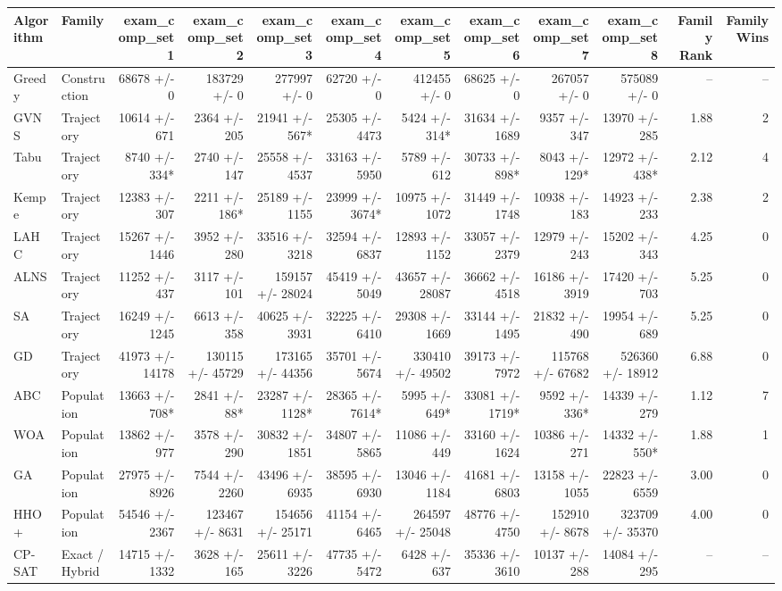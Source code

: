 \begin{tabular}{llrrrrrrrrrr}
\toprule
Algorithm & Family & exam\_comp\_set1 & exam\_comp\_set2 & exam\_comp\_set3 & exam\_comp\_set4 & exam\_comp\_set5 & exam\_comp\_set6 & exam\_comp\_set7 & exam\_comp\_set8 & Family Rank & Family Wins \\
\midrule
Greedy & Construction & 68678 +/- 0 & 183729 +/- 0 & 277997 +/- 0 & 62720 +/- 0 & 412455 +/- 0 & 68625 +/- 0 & 267057 +/- 0 & 575089 +/- 0 & -- & -- \\
GVNS & Trajectory & 10614 +/- 671 & 2364 +/- 205 & 21941 +/- 567* & 25305 +/- 4473 & 5424 +/- 314* & 31634 +/- 1689 & 9357 +/- 347 & 13970 +/- 285 & 1.88 & 2 \\
Tabu & Trajectory & 8740 +/- 334* & 2740 +/- 147 & 25558 +/- 4537 & 33163 +/- 5950 & 5789 +/- 612 & 30733 +/- 898* & 8043 +/- 129* & 12972 +/- 438* & 2.12 & 4 \\
Kempe & Trajectory & 12383 +/- 307 & 2211 +/- 186* & 25189 +/- 1155 & 23999 +/- 3674* & 10975 +/- 1072 & 31449 +/- 1748 & 10938 +/- 183 & 14923 +/- 233 & 2.38 & 2 \\
LAHC & Trajectory & 15267 +/- 1446 & 3952 +/- 280 & 33516 +/- 3218 & 32594 +/- 6837 & 12893 +/- 1152 & 33057 +/- 2379 & 12979 +/- 243 & 15202 +/- 343 & 4.25 & 0 \\
ALNS & Trajectory & 11252 +/- 437 & 3117 +/- 101 & 159157 +/- 28024 & 45419 +/- 5049 & 43657 +/- 28087 & 36662 +/- 4518 & 16186 +/- 3919 & 17420 +/- 703 & 5.25 & 0 \\
SA & Trajectory & 16249 +/- 1245 & 6613 +/- 358 & 40625 +/- 3931 & 32225 +/- 6410 & 29308 +/- 1669 & 33144 +/- 1495 & 21832 +/- 490 & 19954 +/- 689 & 5.25 & 0 \\
GD & Trajectory & 41973 +/- 14178 & 130115 +/- 45729 & 173165 +/- 44356 & 35701 +/- 5674 & 330410 +/- 49502 & 39173 +/- 7972 & 115768 +/- 67682 & 526360 +/- 18912 & 6.88 & 0 \\
ABC & Population & 13663 +/- 708* & 2841 +/- 88* & 23287 +/- 1128* & 28365 +/- 7614* & 5995 +/- 649* & 33081 +/- 1719* & 9592 +/- 336* & 14339 +/- 279 & 1.12 & 7 \\
WOA & Population & 13862 +/- 977 & 3578 +/- 290 & 30832 +/- 1851 & 34807 +/- 5865 & 11086 +/- 449 & 33160 +/- 1624 & 10386 +/- 271 & 14332 +/- 550* & 1.88 & 1 \\
GA & Population & 27975 +/- 8926 & 7544 +/- 2260 & 43496 +/- 6935 & 38595 +/- 6930 & 13046 +/- 1184 & 41681 +/- 6803 & 13158 +/- 1055 & 22823 +/- 6559 & 3.00 & 0 \\
HHO+ & Population & 54546 +/- 2367 & 123467 +/- 8631 & 154656 +/- 25171 & 41154 +/- 6465 & 264597 +/- 25048 & 48776 +/- 4750 & 152910 +/- 8678 & 323709 +/- 35370 & 4.00 & 0 \\
CP-SAT & Exact / Hybrid & 14715 +/- 1332 & 3628 +/- 165 & 25611 +/- 3226 & 47735 +/- 5472 & 6428 +/- 637 & 35336 +/- 3610 & 10137 +/- 288 & 14084 +/- 295 & -- & -- \\
\bottomrule
\end{tabular}
